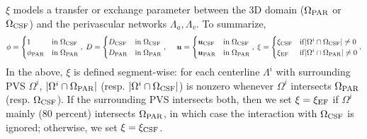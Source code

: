 \documentclass[fleqn,10pt]{wlscirep}
\begin{document}
 $\xi$ models a transfer or exchange parameter between the 3D domain ($\Omega_{\rm PAR}$ or $\Omega_{\rm CSF}$) and the perivascular networks $\Lambda_a, \Lambda_v$. To summarize,
\begin{equation*}
\phi =  \begin{cases}
  1  & \mathrm{in} \;  \Omega_{\rm{CSF}} \\ 
  \phi_{\rm{PAR}} & \mathrm{in} \; \Omega_{\rm{PAR}} 
  \end{cases}, \; 
D = \begin{cases}
  D_{\rm{CSF}} & \mathrm{in} \;  \Omega_{\rm{CSF}} \\ 
  D_{\rm{PAR}} & \mathrm{in} \; \Omega_{\rm{PAR}} \end{cases}, \; 
  \quad \bm u  = \begin{cases}
  \bm{u}_{\rm{CSF}} & \mathrm{in} \; \Omega_{\rm{CSF}} \\ 
  \bm{u}_{\rm{PAR}} & \mathrm{in} \; \Omega_{\rm{PAR}} 
\end{cases}, \; 
\xi = \begin{cases}
  \xi_{\rm{CSF}} & \mathrm{if} |\Omega^i \cap \Omega_{\rm{CSF}}| \neq 0 \\
  \xi_{\rm{EF}} & \mathrm{if} |\Omega^i \cap \Omega_{\rm{PAR}}| \neq 0  
\end{cases} . 
\end{equation*}
In the above, $\xi$ is defined segment-wise: for each centerline $\Lambda^i$ with surrounding PVS $\Omega^i$, $|\Omega^i \cap \Omega_{\rm{PAR}}|$ (resp. $|\Omega^i \cap \Omega_{\rm{CSF}}|$) is nonzero whenever $\Omega^i$ intersects $\Omega_{\rm{PAR}}$ (resp. $\Omega_{\rm{CSF}}$). If the surrounding PVS intersects both, then we set $\xi = \xi_{\rm EF}$ if $\Omega^i$ mainly ($80$ percent) intersects $\Omega_{\rm{PAR}}$, in which case the interaction with $\Omega_{\rm{CSF}}$ is ignored; otherwise, we set $\xi = \xi_{\rm CSF}$. 
 
\end{document}
